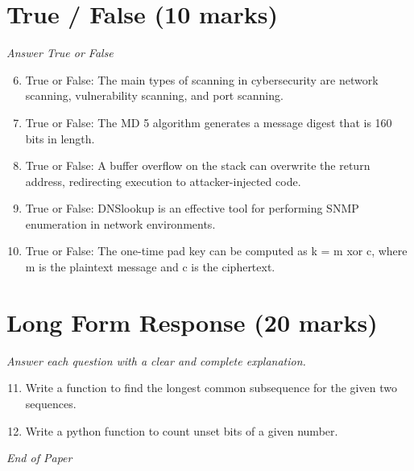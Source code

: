 \documentclass[12pt]{article}
\begin{document}
\section*{True / False (10 marks)}
\textit{Answer True or False}
\begin{enumerate}[label=\arabic*.]
\setcounter{enumi}{5}
\item True or False: The main types of scanning in cybersecurity are network scanning, vulnerability scanning, and port scanning.
\item True or False: The MD 5 algorithm generates a message digest that is 160 bits in length.
\item True or False: A buffer overflow on the stack can overwrite the return address, redirecting execution to attacker-injected code.
\item True or False: DNSlookup is an effective tool for performing SNMP enumeration in network environments.
\item True or False: The one-time pad key can be computed as k = m xor c, where m is the plaintext message and c is the ciphertext.
\end{enumerate}

\section*{Long Form Response (20 marks)}
\textit{Answer each question with a clear and complete explanation.}
\begin{enumerate}[label=\arabic*.]
\setcounter{enumi}{10}
\item Write a function to find the longest common subsequence for the given two sequences.
\item Write a python function to count unset bits of a given number.
\end{enumerate}

\vfill
\noindent\textit{End of Paper}
\end{document}
